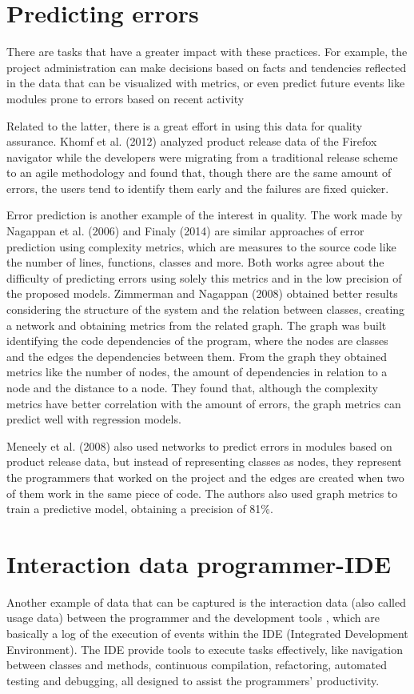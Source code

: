 \section{Predicting errors}
There are tasks that have a greater impact with these practices. For example, the project administration can make decisions based on facts and tendencies reflected in the data that can be visualized with metrics, or even predict future events like modules prone to errors based on recent activity \cite{5}

Related to the latter, there is a great effort in using this data for quality assurance. Khomf et al. (2012) analyzed product release data of the Firefox navigator while the developers were migrating from a traditional release scheme to an agile methodology and found that, though there are the same amount of errors, the users tend to identify them early and the failures are fixed quicker.

Error prediction is another example of the interest in quality. The work made by Nagappan et al. (2006) and Finaly (2014) are similar approaches of error prediction using complexity metrics, which are measures to the source code like the number of lines, functions, classes and more. Both works agree about the difficulty of predicting errors using solely this metrics and in the low precision of the proposed models. Zimmerman and Nagappan (2008) obtained better results considering the structure of the system and the relation between classes, creating a network and obtaining metrics from the related graph. The graph was built identifying the code dependencies of the program, where the nodes are classes and the edges the dependencies between them. From the graph they obtained metrics like the number of nodes, the amount of dependencies in relation to a node and the distance to a node. They found that, although the complexity metrics have better correlation with the amount of errors, the graph metrics can predict well with regression models.

Meneely et al. (2008) also used networks to predict errors in modules based on product release data, but instead of representing classes as nodes, they represent the programmers that worked on the project and the edges are created when two of them work in the same piece of code. The authors also used graph metrics to train a predictive model, obtaining a precision of 81\%.

\section{Interaction data programmer-IDE}
Another example of data that can be captured is the interaction data (also called usage data) between the programmer and the development tools \cite{SnipesETALASD}, which are basically a log of the execution of events within the IDE (Integrated Development Environment). The IDE provide tools to execute tasks effectively, like navigation between classes and methods, continuous compilation, refactoring, automated testing and debugging, all designed to assist the programmers' productivity.

